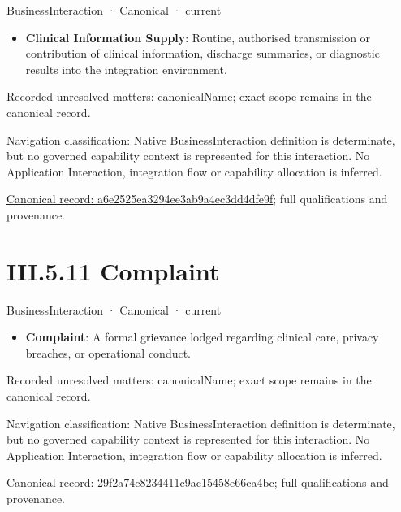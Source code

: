 \label{element:a6e2525ea3294ee3ab9a4ec3dd4dfe9f}
{\small BusinessInteraction · Canonical · current}\par

\begin{itemize}


\item \textbf{Clinical Information Supply}: Routine, authorised transmission or contribution of clinical information, discharge summaries, or diagnostic results into the integration environment.

\end{itemize}

{\small Recorded unresolved matters: canonicalName; exact scope remains in the canonical record.}\par
{\small Navigation classification: Native BusinessInteraction definition is determinate, but no governed capability context is represented for this interaction. No Application Interaction, integration flow or capability allocation is inferred.}\par
{\footnotesize \href{../../../../../../../../continuum/business/business-interaction/a6e2525ea3294ee3ab9a4ec3dd4dfe9f.md}{Canonical record: a6e2525ea3294ee3ab9a4ec3dd4dfe9f}; full qualifications and provenance.}\par
\section*{III.5.11 Complaint}
\label{navigation:III.5.11}

\label{element:29f2a74c8234411c9ac15458e66ca4bc}
{\small BusinessInteraction · Canonical · current}\par

\begin{itemize}


\item \textbf{Complaint}: A formal grievance lodged regarding clinical care, privacy breaches, or operational conduct.

\end{itemize}

{\small Recorded unresolved matters: canonicalName; exact scope remains in the canonical record.}\par
{\small Navigation classification: Native BusinessInteraction definition is determinate, but no governed capability context is represented for this interaction. No Application Interaction, integration flow or capability allocation is inferred.}\par
{\footnotesize \href{../../../../../../../../continuum/business/business-interaction/29f2a74c8234411c9ac15458e66ca4bc.md}{Canonical record: 29f2a74c8234411c9ac15458e66ca4bc}; full qualifications and provenance.}\par
